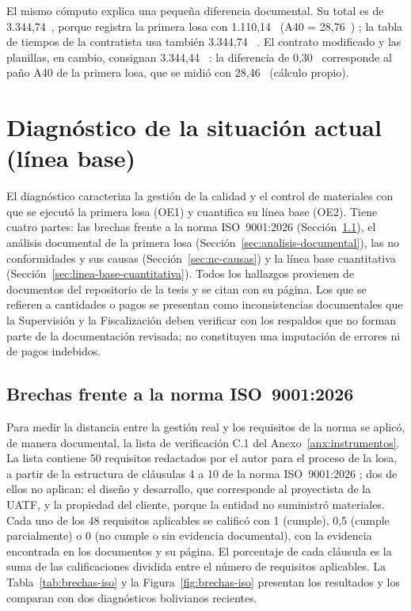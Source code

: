 El mismo cómputo explica una pequeña diferencia documental. Su total es de 3.344,74~\mdos{}, porque registra la primera losa con 1.110,14~\mdos{} (A40 = 28,76~\mdos{}) \parencite[p.~18]{uatf_item13}; la tabla de tiempos de la contratista usa también 3.344,74~\mdos{} \parencite[p.~25]{uatf_item13}. El contrato modificado y las planillas, en cambio, consignan 3.344,44~\mdos{} \parencite[p.~16]{uatf2025pao2}: la diferencia de 0,30~\mdos{} corresponde al paño A40 de la primera losa, que se midió con 28,46~\mdos{} (cálculo propio).

\section{Diagnóstico de la situación actual (línea base)}
\label{sec:diagnostico}

El diagnóstico caracteriza la gestión de la calidad y el control de materiales con que se ejecutó la primera losa (OE1) y cuantifica su línea base (OE2). Tiene cuatro partes: las brechas frente a la norma ISO~9001:2026 (Sección~\ref{sec:brechas-iso}), el análisis documental de la primera losa (Sección~\ref{sec:analisis-documental}), las no conformidades y sus causas (Sección~\ref{sec:nc-causas}) y la línea base cuantitativa (Sección~\ref{sec:linea-base-cuantitativa}). Todos los hallazgos provienen de documentos del repositorio de la tesis y se citan con su página. Los que se refieren a cantidades o pagos se presentan como inconsistencias documentales que la Supervisión y la Fiscalización deben verificar con los respaldos que no forman parte de la documentación revisada; no constituyen una imputación de errores ni de pagos indebidos.

\subsection{Brechas frente a la norma ISO~9001:2026}
\label{sec:brechas-iso}

Para medir la distancia entre la gestión real y los requisitos de la norma se aplicó, de manera documental, la lista de verificación C.1 del Anexo~\ref{anx:instrumentos}. La lista contiene 50 requisitos redactados por el autor para el proceso de la losa, a partir de la estructura de cláusulas 4 a 10 de la norma ISO~9001:2026 \parencite{iso9001_2026}; dos de ellos no aplican: el diseño y desarrollo, que corresponde al proyectista de la UATF, y la propiedad del cliente, porque la entidad no suministró materiales. Cada uno de los 48 requisitos aplicables se calificó con 1 (cumple), 0,5 (cumple parcialmente) o 0 (no cumple o sin evidencia documental), con la evidencia encontrada en los documentos y su página. El porcentaje de cada cláusula es la suma de las calificaciones dividida entre el número de requisitos aplicables. La Tabla~\ref{tab:brechas-iso} y la Figura~\ref{fig:brechas-iso} presentan los resultados y los comparan con dos diagnósticos bolivianos recientes.

